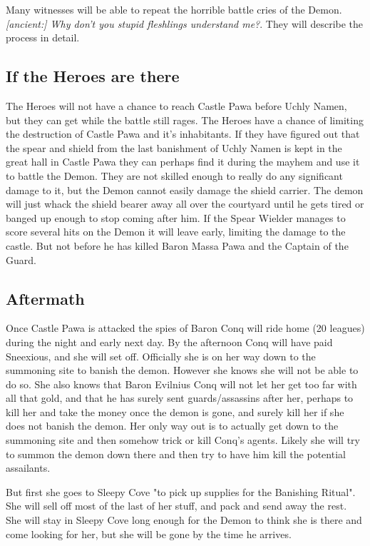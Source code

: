 Many witnesses will be able to repeat the horrible battle cries of the Demon. \emph{[ancient:] Why don't you stupid fleshlings understand me?}. They will describe the process in detail.


\subsection*{If the Heroes are there}
The Heroes will not have a chance to reach Castle Pawa before Uchly Namen, but they can get while the battle still rages. The Heroes have a chance of limiting the destruction of Castle Pawa and it's inhabitants. If they have figured out that the spear and shield from the last banishment of Uchly Namen is kept in the great hall in Castle Pawa they can perhaps find it during the mayhem and use it to battle the Demon. They are not skilled enough to really do any significant damage to it, but the Demon cannot easily damage the shield carrier. The demon will just whack the shield bearer away all over the courtyard until he gets tired or banged up enough to stop coming after him. If the Spear Wielder manages to score several hits on the Demon it will leave early, limiting the damage to the castle. But not before he has killed Baron Massa Pawa and the Captain of the Guard.


\subsection*{Aftermath}
Once Castle Pawa is attacked the spies of Baron Conq will ride home (20 leagues) during the night and early next day. By the afternoon Conq will have paid Sneexious, and she will set off. Officially she is on her way down to the summoning site to banish the demon. However she knows she will not be able to do so. She also knows that Baron Evilnius Conq will not let her get too far with all that gold, and that he has surely sent guards/assassins after her, perhaps to kill her and take the money once the demon is gone, and surely kill her if she does not banish the demon. Her only way out is to actually get down to the summoning site and then somehow trick or kill Conq's agents. Likely she will try to summon the demon down there and then try to have him kill the potential assailants.

But first she goes to Sleepy Cove "to pick up supplies for the Banishing Ritual". She will sell off most of the last of her stuff, and pack and send away the rest. She will stay in Sleepy Cove long enough for the Demon to think she is there and come looking for her, but she will be gone by the time he arrives.

